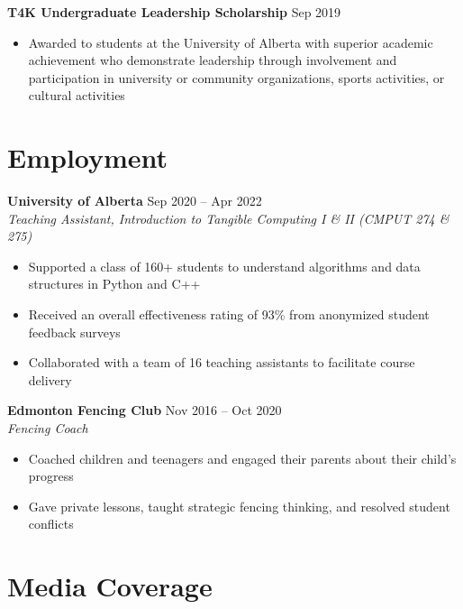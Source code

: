 \documentclass{article}
\begin{document}
\textbf{T4K Undergraduate Leadership Scholarship} \hfill Sep 2019
\begin{itemize}
    \item Awarded to students at the University of Alberta with superior academic achievement who demonstrate leadership through involvement and participation in university or community organizations, sports activities, or cultural activities
\end{itemize}


\section*{\textcolor{my_colour}{Employment}}
\vspace{-.25em} \hrulefill \vspace{.25em}

\textbf{University of Alberta} \hfill Sep 2020 -- Apr 2022 \\
\textit{Teaching Assistant, Introduction to Tangible Computing I \& II (CMPUT 274 \& 275)}
\begin{itemize}
    \item Supported a class of 160+ students to understand algorithms and data structures in Python and C++
    \item Received an overall effectiveness rating of 93\% from anonymized student feedback surveys
    \item Collaborated with a team of 16 teaching assistants to facilitate course delivery
\end{itemize} \vspace{1em}

\textbf{Edmonton Fencing Club} \hfill Nov 2016 -- Oct 2020 \\
\textit{Fencing Coach}
\begin{itemize}
    \item Coached children and teenagers and engaged their parents about their child's progress
    \item Gave private lessons, taught strategic fencing thinking, and resolved student conflicts
\end{itemize}


\section*{\textcolor{my_colour}{Media Coverage}}
\vspace{-.25em} \hrulefill \vspace{.25em}
\end{document}
